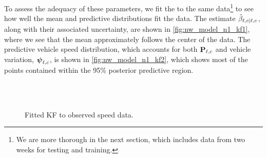To assess the adequacy of these parameters, we fit the \kf{} to the same data\footnote{We are more thorough in the next section, which includes data from two weeks for testing and training.} to see how well the mean and predictive distributions fit the data. The estimate $\hat{\beta}_{\ell,c|\ell,c}$, along with their associated uncertainty, are shown in \cref{fig:nw_model_n1_kf1}, where we see that the mean approximately follows the center of the data. The predictive vehicle speed distribution, which accounts for both $\mathbf{P}_{\ell,c}$ and vehicle variation, $\mathbf{\boldsymbol{\psi}}_{\ell,c}$, is shown in \cref{fig:nw_model_n1_kf2}, which shows most of the points contained within the 95\% posterior predictive region.


\begin{knitrout}\small
{}\color{fgcolor}\begin{figure}

{\centering {}\\
\\

}

\caption[Fitted KF to observed speed data]{Fitted KF to observed speed data.}\label{fig:nw_model_n1_kf}
\end{figure}


\end{knitrout}



